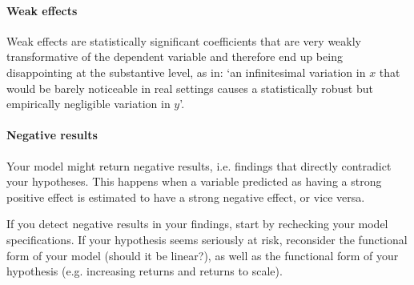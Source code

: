 \paragraph{Weak effects} Weak effects are statistically significant coefficients that are very weakly transformative of the dependent variable and therefore end up being disappointing at the substantive level, as in: `an infinitesimal variation in $x$ that would be barely noticeable in real settings causes a statistically robust but empirically negligible variation in $y$'.%



  

\paragraph{Negative results} Your model might return negative results, i.e. findings that directly contradict your hypotheses. This happens when a variable predicted as having a strong positive effect is estimated to have a strong negative effect, or vice versa.%

  If you detect negative results in your findings, start by rechecking your model specifications. If your hypothesis seems seriously at risk, reconsider the functional form of your model (should it be linear?), as well as the functional form of your hypothesis (e.g. increasing returns and returns to scale).%

